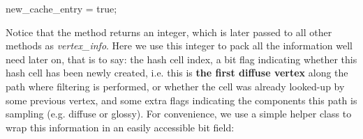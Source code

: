 \begin{DoxyCodeInclude}
            new\_cache\_entry = \textcolor{keyword}{true};
\end{DoxyCodeInclude}
 \begin{DoxyParagraph}{}
Notice that the method returns an integer, which is later passed to all other methods as {\itshape vertex\+\_\+info}. Here we use this integer to pack all the information we\textquotesingle{}ll need later on, that is to say\+: the hash cell index, a bit flag indicating whether this hash cell has been newly created, i.\+e. this is {\bfseries the first diffuse vertex} along the path where filtering is performed, or whether the cell was already looked-\/up by some previous vertex, and some extra flags indicating the components this path is sampling (e.\+g. diffuse or glossy). For convenience, we use a simple helper class to wrap this information in an easily accessible bit field\+:
\end{DoxyParagraph}

